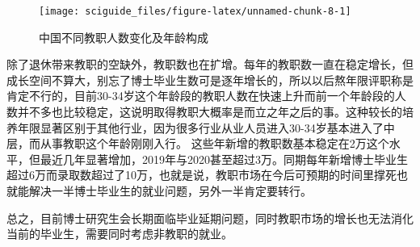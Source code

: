 \documentclass[]{tufte-book}
\newenvironment{Shaded}{}{}
\newcommand{\AttributeTok}[1]{\textcolor[rgb]{0.49,0.56,0.16}{#1}}
\newcommand{\DecValTok}[1]{\textcolor[rgb]{0.25,0.63,0.44}{#1}}
\newcommand{\FunctionTok}[1]{\textcolor[rgb]{0.02,0.16,0.49}{#1}}
\newcommand{\NormalTok}[1]{#1}
\newcommand{\SpecialCharTok}[1]{\textcolor[rgb]{0.25,0.44,0.63}{#1}}
\newcommand{\StringTok}[1]{\textcolor[rgb]{0.25,0.44,0.63}{#1}}
\begin{document}
\begin{Shaded}
\end{Shaded}

\begin{figure}
\texttt{[image: sciguide\_files/figure-latex/unnamed-chunk-8-1]} \caption[中国不同教职人数变化及年龄构成]{中国不同教职人数变化及年龄构成}\label{fig:unnamed-chunk-8}
\end{figure}

除了退休带来教职的空缺外，教职数也在扩增。每年的教职数一直在稳定增长，但成长空间不算大，别忘了博士毕业生数可是逐年增长的，所以以后熬年限评职称是肯定不行的，目前30-34岁这个年龄段的教职人数在快速上升而前一个年龄段的人数并不多也比较稳定，这说明取得教职大概率是而立之年之后的事。这种较长的培养年限显著区别于其他行业，因为很多行业从业人员进入30-34岁基本进入了中层，而从事教职这个年龄刚刚入行。
这些年新增的教职数基本稳定在2万这个水平，但最近几年显著增加，2019年与2020甚至超过3万。同期每年新增博士毕业生超过6万而录取数超过了10万，也就是说，教职市场在今后可预期的时间里撑死也就能解决一半博士毕业生的就业问题，另外一半肯定要转行。

总之，目前博士研究生会长期面临毕业延期问题，同时教职市场的增长也无法消化当前的毕业生，需要同时考虑非教职的就业。
\end{document}
